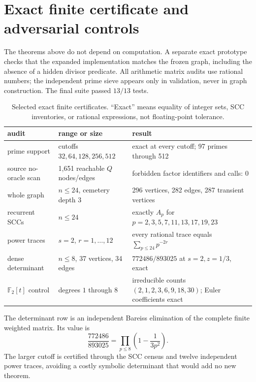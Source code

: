 \section{Exact finite certificate and adversarial controls}
\label{sec:finite}

The theorems above do not depend on computation.  A separate exact prototype
checks that the expanded implementation matches the frozen graph, including
the absence of a hidden divisor predicate.  All arithmetic matrix audits use
rational numbers; the independent prime sieve appears only in validation,
never in graph construction.  The final suite passed $13/13$ tests.

\begin{table}[t]
\centering
\small
\caption{Selected exact finite certificates.  ``Exact'' means equality of
integer sets, SCC inventories, or rational expressions, not floating-point
tolerance.}
\label{tab:certificate}
\begin{tabularx}{\textwidth}{L{0.25\textwidth}L{0.23\textwidth}X}
\toprule
audit & range or size & result \\
\midrule
prime support & cutoffs $32,64,128,256,512$ & exact at every cutoff; 97 primes through 512 \\
source no-oracle scan & 1,651 reachable $Q$ nodes/edges & forbidden factor identifiers and calls: 0 \\
whole graph & $n\le24$, cemetery depth 3 & 296 vertices, 282 edges, 287 transient vertices \\
recurrent SCCs & $n\le24$ & exactly $A_p$ for $p=2,3,5,7,11,13,17,19,23$ \\
power traces & $s=2$, $r=1,\ldots,12$ & every rational trace equals $\sum_{p\le24}p^{-2r}$ \\
dense determinant & $n\le8$, 37 vertices, 34 edges & $772486/893025$ at $s=2,z=1/3$, exact \\
$\mathbb F_2[t]$ control & degrees $1$ through 8 & irreducible counts $(2,1,2,3,6,9,18,30)$; Euler coefficients exact \\
\bottomrule
\end{tabularx}
\end{table}

The determinant row is an independent Bareiss elimination of the complete
finite weighted matrix.  Its value is
\[
\frac{772486}{893025}
=\prod_{p\le8}\left(1-\frac1{3p^2}\right).
\]
The larger cutoff is certified through the SCC census and twelve independent
power traces, avoiding a costly symbolic determinant that would add no new
theorem.

